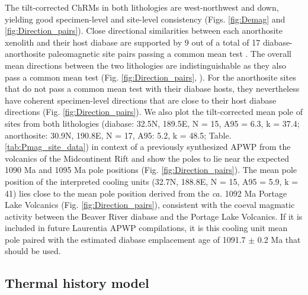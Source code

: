 The tilt-corrected ChRMs in both lithologies are west-northwest and down, yielding good specimen-level and site-level consistency (Figs. \ref{fig:Demag} and \ref{fig:Direction_pairs}). Close directional similarities between each anorthosite xenolith and their host diabase are supported by 9 out of a total of 17 diabase-anorthosite paleomagnetic site pairs passing a common mean test \cite{McFadden1990a}. The overall mean directions between the two lithologies are indistinguishable as they also pass a common mean test (Fig. \ref{fig:Direction_pairs}, ). For the anorthosite sites that do not pass a common mean test with their diabase hosts, they nevertheless have coherent specimen-level directions that are close to their host diabase directions (Fig. \ref{fig:Direction_pairs}). We also plot the tilt-corrected mean pole of sites from both lithologies (diabase: 32.5\textdegree N, 189.5\textdegree E, N = 15, A95 = 6.3, k = 37.4; anorthosite: 30.9\textdegree N, 190.8\textdegree E, N = 17, A95: 5.2, k = 48.5; Table. \ref{tab:Pmag_site_data}) in context of a previously synthesized APWP from the volcanics of the Midcontinent Rift \cite{Swanson-Hysell2019a} and show the poles to lie near the expected 1090 Ma and 1095 Ma pole positions (Fig. \ref{fig:Direction_pairs}). The mean pole position of the interpreted cooling units (32.7\textdegree N, 188.8\textdegree E, N = 15, A95 = 5.9, k = 41) lies close to the mean pole position derived from the \textit{ca.} 1092 Ma Portage Lake Volcanics (Fig. \ref{fig:Direction_pairs}), consistent with the coeval magmatic activity between the Beaver River diabase and the Portage Lake Volcanics. If it is included in future Laurentia APWP compilations, it is this cooling unit mean pole paired with the estimated diabase emplacement age of 1091.7 $\pm$ 0.2 Ma that should be used.

\subsection{Thermal history model}

